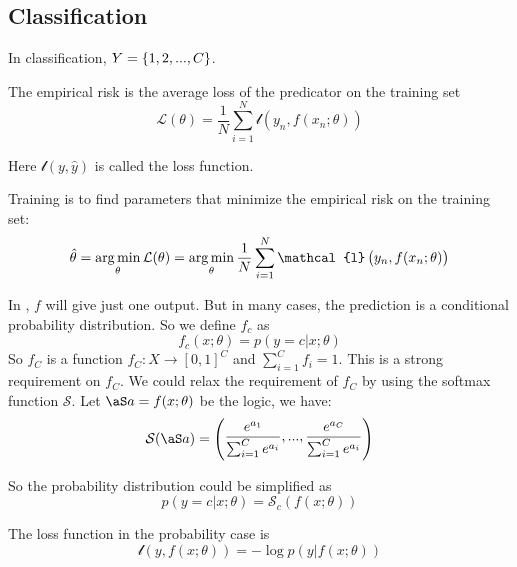 \subsection{Classification}
In classification, $Y = \set{1, 2, ... , C}$.

\begin{definition}\label{empirical_risk}
    The empirical risk is the average loss of the predicator on the training set
    \begin{equation}
        \mathcal{L}(\theta) = \frac{1}{N} \sum_{i=1}^N \mathcal{l}\left( y_n, f(x_n; \theta) \right)
    \end{equation}
    
    Here $\mathcal{l}(y, \hat{y})$ is called the loss function.
\end{definition}

\begin{definition}[Training]
    Training is to find parameters that minimize the empirical risk on the training set:
    \begin{equation}
        \hat{\theta} = \argmin{\theta}\mathcal{L}(\theta) = \argmin{\theta} \frac{1}{N} \sum_{i=1}^N \mathcal{l}\left( y_n, f(x_n; \theta) \right)
    \end{equation}
\end{definition}

\begin{definition}
    In , $f$ will give just one output. But in many cases, the prediction is a conditional probability distribution. So we define $f_c$ as
    \begin{equation}
        f_c(x;\theta) = p(y=c|x;\theta)
    \end{equation}
    So $f_C$ is a function $f_C: X \rightarrow [0,1]^C$ and $\displaystyle \sum_{i=1}^C f_i = 1$. This is a strong requirement on $f_C$. We could relax the requirement of $f_C$ by using the softmax function $\mathcal{S}$. Let $\columnvector{a} = f(x;\theta)$ be the logic, we have:
    \begin{equation}
        \mathcal{S}(\columnvector{a}) = \begin{pmatrix}\displaystyle
            \frac{e^{a_1}}{\sum_{i=1}^C e^{a_i}}, ..., \frac{e^{a_C}}{\sum_{i=1}^C e^{a_i}}
        \end{pmatrix}
    \end{equation}
    
    So the probability distribution could be simplified as
    \begin{equation}
        p(y=c|x;\theta) = \mathcal{S}_c \left(f(x;\theta)\right)
    \end{equation}
    
    The loss function in the probability case is 
    \begin{equation}
        \mathcal{l}(y, f(x;\theta)) = - \log p(y|f(x;\theta))
    \end{equation}
\end{definition}

